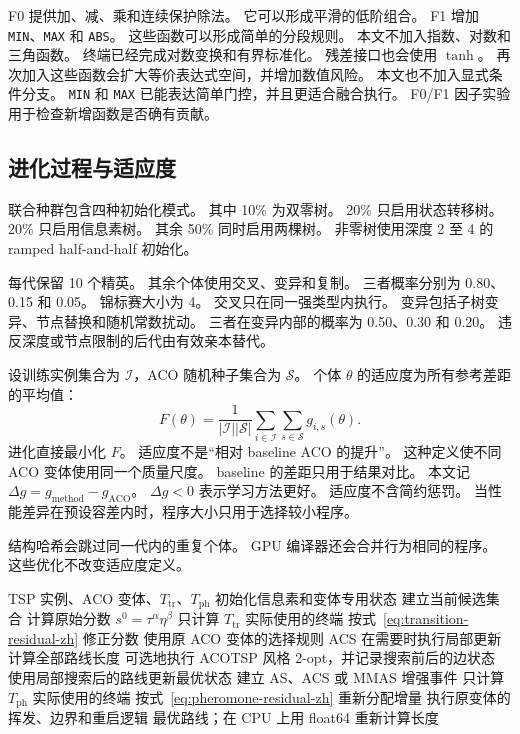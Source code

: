 \documentclass[letterpaper,journal]{IEEEtran}
\begin{document}
F0 提供加、减、乘和连续保护除法。
它可以形成平滑的低阶组合。
F1 增加 \texttt{MIN}、\texttt{MAX} 和 \texttt{ABS}。
这些函数可以形成简单的分段规则。
本文不加入指数、对数和三角函数。
终端已经完成对数变换和有界标准化。
残差接口也会使用 \(\tanh\)。
再次加入这些函数会扩大等价表达式空间，并增加数值风险。
本文也不加入显式条件分支。
\texttt{MIN} 和 \texttt{MAX} 已能表达简单门控，并且更适合融合执行。
F0/F1 因子实验用于检查新增函数是否确有贡献。

\subsection{进化过程与适应度}

联合种群包含四种初始化模式。
其中 10\% 为双零树。
20\% 只启用状态转移树。
20\% 只启用信息素树。
其余 50\% 同时启用两棵树。
非零树使用深度 2 至 4 的 ramped half-and-half 初始化。

每代保留 10 个精英。
其余个体使用交叉、变异和复制。
三者概率分别为 0.80、0.15 和 0.05。
锦标赛大小为 4。
交叉只在同一强类型内执行。
变异包括子树变异、节点替换和随机常数扰动。
三者在变异内部的概率为 0.50、0.30 和 0.20。
违反深度或节点限制的后代由有效亲本替代。

设训练实例集合为 \(\mathcal I\)，ACO 随机种子集合为 \(\mathcal S\)。
个体 \(\theta\) 的适应度为所有参考差距的平均值：
\begin{equation}
 F(\theta)=
 \frac{1}{|\mathcal I||\mathcal S|}
 \sum_{i\in\mathcal I}\sum_{s\in\mathcal S}g_{i,s}(\theta).
 \label{eq:fitness-zh}
\end{equation}
进化直接最小化 \(F\)。
适应度不是“相对 baseline ACO 的提升”。
这种定义使不同 ACO 变体使用同一个质量尺度。
baseline 的差距只用于结果对比。
本文记 \(\Delta g=g_{\mathrm{method}}-g_{\mathrm{ACO}}\)。
\(\Delta g<0\) 表示学习方法更好。
适应度不含简约惩罚。
当性能差异在预设容差内时，程序大小只用于选择较小程序。

结构哈希会跳过同一代内的重复个体。
GPU 编译器还会合并行为相同的程序。
这些优化不改变适应度定义。

\begin{algorithm}[t]
\caption{一次 RMTGP-ACO 模拟}
\label{alg:rmtgp-aco-zh}
\begin{algorithmic}[1]
\REQUIRE TSP 实例、ACO 变体、\(T_{\mathrm{tr}}\)、\(T_{\mathrm{ph}}\)
\STATE 初始化信息素和变体专用状态
        \STATE 建立当前候选集合
        \STATE 计算原始分数 \(s^0=\tau^\alpha\eta^\beta\)
        \STATE 只计算 \(T_{\mathrm{tr}}\) 实际使用的终端
        \STATE 按式~\eqref{eq:transition-residual-zh} 修正分数
        \STATE 使用原 ACO 变体的选择规则
        \STATE ACS 在需要时执行局部更新
    \ENDFOR
    \STATE 计算全部路线长度
    \STATE 可选地执行 ACOTSP 风格 2-opt，并记录搜索前后的边状态
    \STATE 使用局部搜索后的路线更新最优状态
    \STATE 建立 AS、ACS 或 MMAS 增强事件
    \STATE 只计算 \(T_{\mathrm{ph}}\) 实际使用的终端
    \STATE 按式~\eqref{eq:pheromone-residual-zh} 重新分配增量
    \STATE 执行原变体的挥发、边界和重启逻辑
\ENDFOR
\RETURN 最优路线；在 CPU 上用 float64 重新计算长度
\end{algorithmic}
\end{algorithm}
\end{document}
